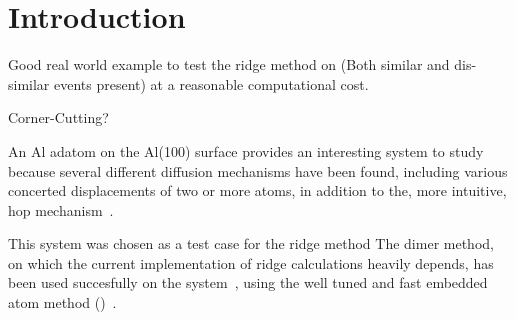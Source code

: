 \section{Introduction}
\label{sec:al-introduction}

\bit
\item Good real world example to test the ridge method on (Both similar and dis-similar events present) at a reasonable computational cost.
\item Corner-Cutting?
\eit

An Al adatom on the Al(100) surface provides an interesting system to study because several different diffusion mechanisms have been found, including various concerted displacements of two or more atoms, in addition to the, more intuitive, hop mechanism~\cite{concerted-motion-1990, dimer-original-1999, ts-opt-2001}.

This system was chosen as a test case for the ridge method \expand
The dimer method, on which the current implementation of ridge calculations heavily depends, has been used succesfully on the system~\cite{dimer-original1999}, using the well tuned and fast embedded atom method ()~\cite{eam-1983, eam-1986}.

\incomplete
